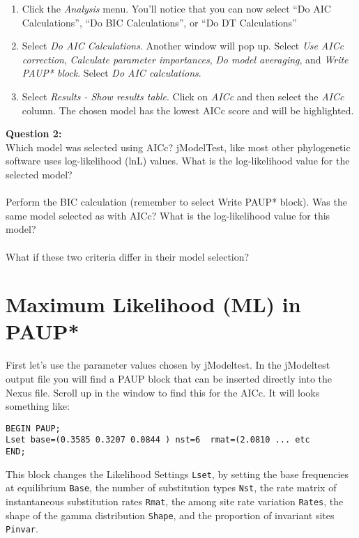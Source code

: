 \documentclass[11pt]{article}
\begin{document}
\begin{enumerate}

\item Click the \textit{Analysis} menu.  You’ll notice that you can now select ``Do AIC Calculations'', ``Do BIC Calculations'', or ``Do DT Calculations''

\item Select \textit{Do AIC Calculations}.  Another window will pop up.  Select \textit{Use AICc correction}, \textit{Calculate parameter importances}, 
        \textit{Do model averaging}, and \textit{Write PAUP* block}.  Select \textit{Do AIC calculations}.
\item Select \textit{Results - Show results table}.  Click on \textit{AICc} and then select the \textit{AICc} column.  
The chosen model has the lowest AICc score and will be highlighted.

\end{enumerate}


\begin{framed}
\noindent
\textbf{Question 2:} \\
Which model was selected using AICc?  
jModelTest, like most other phylogenetic software uses log-likelihood (lnL) values.
What is the log-likelihood value for the selected model? \\
\\
Perform the BIC calculation (remember to select Write PAUP* block).  
Was the same model selected as with AICc?  
What is the log-likelihood value for this model? \\
\\
What if these two criteria differ in their model selection?  
\end{framed}

\section{Maximum Likelihood (ML) in PAUP*}

First let's use the parameter values chosen by jModeltest.
In the jModeltest output file you will find a PAUP block that can be inserted directly into the Nexus file.  
Scroll up in the window to find this for the AICc.  
It will looks something like:

\begin{verbatim}
BEGIN PAUP;
Lset base=(0.3585 0.3207 0.0844 ) nst=6  rmat=(2.0810 ... etc
END;
\end{verbatim}
\noindent
This block changes the Likelihood Settings \texttt{Lset}, 
by setting the base frequencies at equilibrium \texttt{Base}, 
the number of substitution types \texttt{Nst}, 
the rate matrix of instantaneous substitution rates \texttt{Rmat}, 
the among site rate variation \texttt{Rates}, 
the shape of the gamma distribution \texttt{Shape}, 
and the proportion of invariant sites \texttt{Pinvar}.
\end{document}
